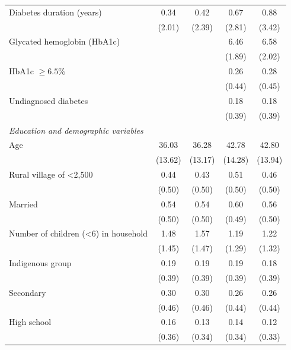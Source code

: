 \documentclass[12pt,english]{article}
\begin{document}
\begin{table}
\begin{adjustbox}{max width=0.9\textwidth, center}
{\begin{tabular}{l*{4}{c}}
Diabetes duration (years)   &        0.34&        0.42&        0.67&        0.88\\
                    &      (2.01)&      (2.39)&      (2.81)&      (3.42)\\
Glycated hemoglobin (HbA1c)&            &            &        6.46&        6.58\\
                    &            &            &      (1.89)&      (2.02)\\
HbA1c $\geq 6.5\%$  &            &            &        0.26&        0.28\\
                    &            &            &      (0.44)&      (0.45)\\
Undiagnosed diabetes&            &            &        0.18&        0.18\\
                    &            &            &      (0.39)&      (0.39)\\
\hspace*{10mm}\emph{Education and demographic variables} \\
Age                 &       36.03&       36.28&       42.78&       42.80\\
                    &     (13.62)&     (13.17)&     (14.28)&     (13.94)\\
Rural village of <2,500&        0.44&        0.43&        0.51&        0.46\\
                    &      (0.50)&      (0.50)&      (0.50)&      (0.50)\\
Married             &        0.54&        0.54&        0.60&        0.56\\
                    &      (0.50)&      (0.50)&      (0.49)&      (0.50)\\
Number of children (<6) in household&        1.48&        1.57&        1.19&        1.22\\
                    &      (1.45)&      (1.47)&      (1.29)&      (1.32)\\
Indigenous group    &        0.19&        0.19&        0.19&        0.18\\
                    &      (0.39)&      (0.39)&      (0.39)&      (0.39)\\
Secondary           &        0.30&        0.30&        0.26&        0.26\\
                    &      (0.46)&      (0.46)&      (0.44)&      (0.44)\\
High school         &        0.16&        0.13&        0.14&        0.12\\
                    &      (0.36)&      (0.34)&      (0.34)&      (0.33)\\

\end{tabular}}
\end{adjustbox}
\end{table}
\end{document}
